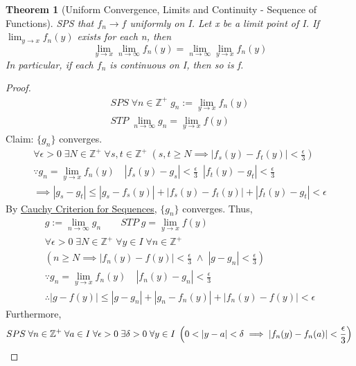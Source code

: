 \documentclass[11pt, oneside]{book}
\theoremstyle{break}
\newtheorem{thm}{Theorem}[section]
\newtheorem*{proof}{Proof}
\newcommand{\bb}[1]{\mathbb{#1}}			%
\begin{document}
\begin{thm}[Uniform Convergence, Limits and Continuity - Sequence of Functions]
	SPS that $f_n \to f$ uniformly on I. Let x be a limit point of I. If $\lim_{y \to x} f_n(y)$ exists for each n, then
	\begin{equation*}
		\lim_{y \to x} \lim_{n \to \infty} f_n(y) = \lim_{n \to \infty} \lim_{y \to x} f_n(y)
	\end{equation*}
	In particular, if each $f_n$ is continuous on I, then so is f.
\end{thm}

\begin{proof}
	\begin{gather*}
		SPS \; \forall n \in \bb{Z}^+ \; g_n := \lim_{y \to x} f_n(y) \\
		STP \; \lim_{n \to \infty} g_n = \lim_{y \to x} f(y)
	\end{gather*}
	Claim: $\{g_n\}$ converges.
	\begin{gather*}
		\forall \epsilon > 0 \; \exists N \in \bb{Z}^+ \; \forall s, t \in \bb{Z}^+ \; \left(s, t \geq N \implies |f_s(y) - f_t(y)| < \frac{\epsilon}{3} \right) \\
		\because g_n = \lim_{y \to x} f_n(y) \quad |f_s(y) - g_s| < \frac{\epsilon}{3} \enspace |f_t(y) - g_t| < \frac{\epsilon}{3} \\
		\implies |g_s - g_t| \leq |g_s - f_s(y)| + |f_s(y) - f_t(y)| + |f_t(y) - g_t| < \epsilon
	\end{gather*}
	By \hyperref[CauchyCriterion_Seq]{Cauchy Criterion for Sequences}, $\{g_n\}$ converges. Thus,
	\begin{gather*}
		g := \lim_{n \to \infty} g_n \qquad STP \; g = \lim_{y \to x} f(y) \\
		\forall \epsilon > 0 \; \exists N \in \bb{Z}^+ \; \forall y \in I \; \forall n \in \bb{Z}^+ \\
		\left( n \geq N \implies |f_n(y) - f(y)| < \frac{\epsilon}{3} \; \land \; |g - g_n| < \frac{\epsilon}{3}  \right) \\
		\because g_n = \lim_{y \to x} f_n(y) \quad |f_n(y) - g_n| < \frac{\epsilon}{3} \\
		\therefore |g - f(y)| \leq |g - g_n| + |g_n - f_n(y)| + |f_n(y) - f(y)| < \epsilon
	\end{gather*}
	Furthermore,
	\begin{equation*}
		SPS \; \forall n \in \bb{Z}^+ \; \forall a \in I \; \forall \epsilon > 0 \; \exists \delta > 0 \; \forall y \in I \; \left( 0 < |y - a| < \delta \implies |f_n(y) - f_n(a)| < \frac{\epsilon}{3}  \right) \\

\end{equation*}
\end{proof}
\end{document}
